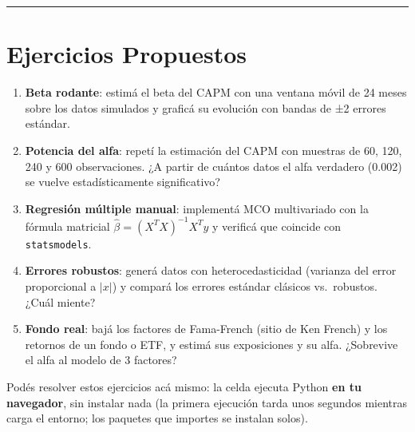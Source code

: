 \documentclass[
  spanish,
  letterpaper,
  DIV=11,
  numbers=noendperiod]{scrreprt}
\providecommand{\tightlist}{%
  \setlength{\itemsep}{0pt}\setlength{\parskip}{0pt}}
\begin{document}
\begin{center}\rule{0.5\linewidth}{0.5pt}\end{center}

\chapter{Ejercicios Propuestos}\label{ejercicios-propuestos-14}

\begin{tcolorbox}[enhanced jigsaw, bottomrule=.15mm, colback=white, opacitybacktitle=0.6, arc=.35mm, toprule=.15mm, opacityback=0, breakable, titlerule=0mm, left=2mm, coltitle=black, colbacktitle=quarto-callout-important-color!10!white, colframe=quarto-callout-important-color-frame, leftrule=.75mm, toptitle=1mm, bottomtitle=1mm, title=\textcolor{quarto-callout-important-color}{\faExclamation}\hspace{0.5em}{Ejercicios}, rightrule=.15mm]

\begin{enumerate}
\def\labelenumi{\arabic{enumi}.}
\tightlist
\item
  \textbf{Beta rodante}: estimá el beta del CAPM con una ventana móvil
  de 24 meses sobre los datos simulados y graficá su evolución con
  bandas de ±2 errores estándar.
\item
  \textbf{Potencia del alfa}: repetí la estimación del CAPM con muestras
  de 60, 120, 240 y 600 observaciones. ¿A partir de cuántos datos el
  alfa verdadero (0.002) se vuelve estadísticamente significativo?
\item
  \textbf{Regresión múltiple manual}: implementá MCO multivariado con la
  fórmula matricial \(\hat\beta = (X^TX)^{-1}X^Ty\) y verificá que
  coincide con \texttt{statsmodels}.
\item
  \textbf{Errores robustos}: generá datos con heterocedasticidad
  (varianza del error proporcional a \(|x|\)) y compará los errores
  estándar clásicos vs.~robustos. ¿Cuál miente?
\item
  \textbf{Fondo real}: bajá los factores de Fama-French (sitio de Ken
  French) y los retornos de un fondo o ETF, y estimá sus exposiciones y
  su alfa. ¿Sobrevive el alfa al modelo de 3 factores?
\end{enumerate}

\end{tcolorbox}

Podés resolver estos ejercicios acá mismo: la celda ejecuta Python
\textbf{en tu navegador}, sin instalar nada (la primera ejecución tarda
unos segundos mientras carga el entorno; los paquetes que importes se
instalan solos).
\end{document}
